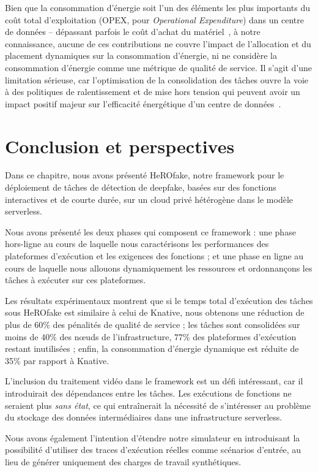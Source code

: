 Bien que la consommation d'énergie soit l'un des éléments les plus importants du coût total d'exploitation (OPEX, pour \textit{Operational Expenditure}) dans un centre de données -- dépassant parfois le coût d'achat du matériel~\cite{7279063}, à notre connaissance, aucune de ces contributions ne couvre l'impact de l'allocation et du placement dynamiques sur la consommation d'énergie, ni ne considère la consommation d'énergie comme une métrique de qualité de service. Il s'agit d'une limitation sérieuse, car l'optimisation de la consolidation des tâches ouvre la voie à des politiques de ralentissement et de mise hors tension qui peuvent avoir un impact positif majeur sur l'efficacité énergétique d'un centre de données~\cite{chaurasiaComprehensiveSurveyEnergyaware2021}.

\section{Conclusion et perspectives}
\label{section:herofake-conclusion}

Dans ce chapitre, nous avons présenté HeROfake, notre framework pour le déploiement de tâches de détection de deepfake, basées sur des fonctions interactives et de courte durée, sur un cloud privé hétérogène dans le modèle serverless.

Nous avons présenté les deux phases qui composent ce framework : une phase hors-ligne au cours de laquelle nous caractérisons les performances des plateformes d'exécution et les exigences des fonctions ; et une phase en ligne au cours de laquelle nous allouons dynamiquement les ressources et ordonnançons les tâches à exécuter sur ces plateformes.

Les résultats expérimentaux montrent que si le temps total d'exécution des tâches sous HeROfake est similaire à celui de Knative, nous obtenons une réduction de plus de 60\% des pénalités de qualité de service ; les tâches sont consolidées sur moins de 40\% des nœuds de l'infrastructure, 77\% des plateformes d'exécution restant inutilisées ; enfin, la consommation d'énergie dynamique est réduite de 35\% par rapport à Knative.

L'inclusion du traitement vidéo dans le framework est un défi intéressant, car il introduirait des dépendances entre les tâches. Les exécutions de fonctions ne seraient plus \textit{sans état}, ce qui entraînerait la nécessité de s'intéresser au problème du stockage des données intermédiaires dans une infrastructure serverless.

Nous avons également l'intention d'étendre notre simulateur en introduisant la possibilité d'utiliser des traces d'exécution réelles comme scénarios d'entrée, au lieu de générer uniquement des charges de travail synthétiques.
